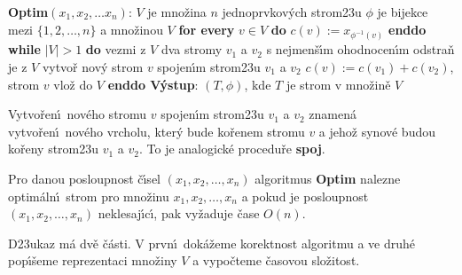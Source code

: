{\bf Optim$(x_1,x_2,\dots x_n)$}:\newline 
$V$ je mno\v zina $n$ jednoprvkov\'ych strom\accent23u\newline 
$\phi$ je bijekce mezi $\{1,2,\dots,n\}$ a mno\v zinou $V$\newline 
{\bf for every} $v\in V$ {\bf do} $c(v):=x_{\phi^{-1}(v)}$ {\bf enddo\newline 
while} $|V|>1$ {\bf do\newline 
\phantom{{\rm---}}}vezmi z $V$ dva stromy $v_1$ a $v_2$ s nejmen\v s\'\i m ohodnocen\'\i m\newline 
\phantom{---}odstra\v n je z $V$\newline 
\phantom{---}vytvo\v r nov\'y strom $v$ spojen\'\i m strom\accent23u $
v_1$ a $v_2$\newline 
\phantom{---}$c(v):=c(v_1)+c(v_2)$, strom $v$ vlo\v z do $V$\newline 
{\bf enddo\newline 
V\'ystup}: $(T,\phi )$, kde $T$ je strom v mno\v zin\v e $V$
\bigskip

\flushpar Vytvo\v ren\'\i\ nov\'eho stromu $v$ spojen\'\i m strom\accent23u 
$v_1$ a $v_2$ znamen\'a vytvo\v ren\'\i\ nov\'eho vrcholu, kter\'y bude 
ko\v renem stromu $v$ a jeho\v z synov\'e budou ko\v reny strom\accent23u 
$v_1$ a $v_2$. To je analogick\'e procedu\v re {\bf spoj}.
\medskip

Pro danou posloupnost \v c\'\i sel 
$(x_1,x_2,\dots,x_n)$ algoritmus {\bf Optim} nalezne optim\'aln\'\i\ strom 
pro mno\v zinu $x_1,x_2,\dots,x_n$ a pokud je posloupnost 
$(x_1,x_2,\dots,x_n)$ neklesaj\'\i c\'\i , pak vy\v za\-du\-je \v case 
$O(n)$.  
\endproclaim

D\accent23ukaz m\'a dv\v e \v c\'asti. V 
prvn\'\i\ dok\'a\v zeme korektnost algoritmu a ve druh\'e pop\'\i\v seme 
reprezentaci mno\v ziny $V$ a vypo\v cteme \v casovou slo\v zitost.
\medskip

